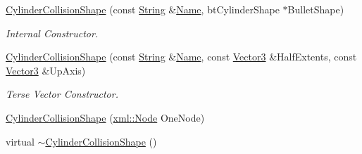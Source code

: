 \begin{DoxyCompactItemize}
\hyperlink{classMezzanine_1_1CylinderCollisionShape_a5f1765f49d8c7f48df29264314bd8c5a}{CylinderCollisionShape} (const \hyperlink{namespaceMezzanine_acf9fcc130e6ebf08e3d8491aebcf1c86}{String} \&\hyperlink{classMezzanine_1_1CollisionShape_aac524c5c56fa4d158bc071f8aecfbe79}{Name}, btCylinderShape $\ast$BulletShape)
\begin{DoxyCompactList}\small\item\em Internal Constructor. \item\end{DoxyCompactList}\item 
\hyperlink{classMezzanine_1_1CylinderCollisionShape_a541f91adac5f553466fc3e2d2445ed78}{CylinderCollisionShape} (const \hyperlink{namespaceMezzanine_acf9fcc130e6ebf08e3d8491aebcf1c86}{String} \&\hyperlink{classMezzanine_1_1CollisionShape_aac524c5c56fa4d158bc071f8aecfbe79}{Name}, const \hyperlink{classMezzanine_1_1Vector3}{Vector3} \&HalfExtents, const \hyperlink{classMezzanine_1_1Vector3}{Vector3} \&UpAxis)
\begin{DoxyCompactList}\small\item\em Terse Vector Constructor. \item\end{DoxyCompactList}\item 
\hyperlink{classMezzanine_1_1CylinderCollisionShape_a35ec7c03acd0407ea7174fbc845e403a}{CylinderCollisionShape} (\hyperlink{classMezzanine_1_1xml_1_1Node}{xml::Node} OneNode)
\item 
\hypertarget{classMezzanine_1_1CylinderCollisionShape_a6479b7afe2caab5b4682903ea6a1bee5}{
virtual \hyperlink{classMezzanine_1_1CylinderCollisionShape_a6479b7afe2caab5b4682903ea6a1bee5}{$\sim$CylinderCollisionShape} ()}
\label{classMezzanine_1_1CylinderCollisionShape_a6479b7afe2caab5b4682903ea6a1bee5}


\end{DoxyCompactItemize}
